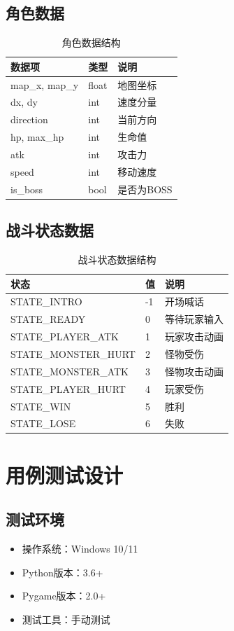 \documentclass[a4paper,12pt]{article}
\begin{document}
\subsection{角色数据}
\begin{table}[h]
\centering
\caption{角色数据结构}
\begin{tabular}{lll}
\toprule
数据项 & 类型 & 说明 \\
\midrule
map\_x, map\_y & float & 地图坐标 \\
dx, dy & int & 速度分量 \\
direction & int & 当前方向 \\
hp, max\_hp & int & 生命值 \\
atk & int & 攻击力 \\
speed & int & 移动速度 \\
is\_boss & bool & 是否为BOSS \\
\bottomrule
\end{tabular}
\end{table}

\subsection{战斗状态数据}
\begin{table}[h]
\centering
\caption{战斗状态数据结构}
\begin{tabular}{lll}
\toprule
状态 & 值 & 说明 \\
\midrule
STATE\_INTRO & -1 & 开场喊话 \\
STATE\_READY & 0 & 等待玩家输入 \\
STATE\_PLAYER\_ATK & 1 & 玩家攻击动画 \\
STATE\_MONSTER\_HURT & 2 & 怪物受伤 \\
STATE\_MONSTER\_ATK & 3 & 怪物攻击动画 \\
STATE\_PLAYER\_HURT & 4 & 玩家受伤 \\
STATE\_WIN & 5 & 胜利 \\
STATE\_LOSE & 6 & 失败 \\
\bottomrule
\end{tabular}
\end{table}

\section{用例测试设计}

\subsection{测试环境}
\begin{itemize}
\item 操作系统：Windows 10/11
\item Python版本：3.6+
\item Pygame版本：2.0+
\item 测试工具：手动测试
\end{itemize}
\end{document}
